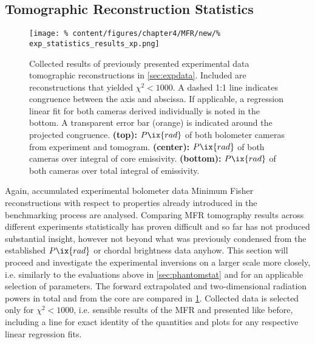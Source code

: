         \subsection{Tomographic Reconstruction Statistics}\label{sec:expstat}%
%
                \begin{figure}[t]%
                    \centering%
                    \captionsetup{width=.47\textwidth}%
                    \begin{minipage}[c]{0.47\textwidth}%
                        \centering%
                        \texttt{[image: \%
                            content/figures/chapter4/MFR/new/\%
                            exp\_statistics\_results\_xp.png]}%
                    \end{minipage}%
                    \hfill%
                    \begin{minipage}[c]{0.47\textwidth}%
                        \centering%
                        \caption{%
                            Collected results of previously presented experimental data tomographic reconstructions in \cref{sec:expdata}. Included are reconstructions that yielded $\chi^{2}<1000$. A dashed 1:1 line indicates congruence between the axis and abscissa. If applicable, a regression linear fit for both cameras derived individually is noted in the bottom. A transparent error bar (orange) is indicated around the projected congruence. \textbf{(top):} $P\ix{rad}$ of both bolometer cameras from experiment and tomogram. \textbf{(center):} $P\ix{rad}$ of both cameras over integral of core emissivity. \textbf{(bottom):} $P\ix{rad}$ of both cameras over total integral of emissivity.
                            }\label{fig:tomo_experiment_statistics}%
                    \end{minipage}%
                \end{figure}%
%
                Again, accumulated experimental bolometer data Minimum Fisher reconstructions with respect to properties already introduced in the benchmarking process are analysed. Comparing MFR tomography results across different experiments statistically has proven difficult and so far has not produced substantial insight, however not beyond what was previously condensed from the established $P\ix{rad}$ or chordal brightness data anyhow. This section will proceed and investigate the experimental inversions on a larger scale more closely, i.e. similarly to the evaluations above in \cref{sec:phantomstat} and for an applicable selection of parameters. The forward extrapolated and two-dimensional radiation powers in total and from the core are compared in \cref{fig:tomo_experiment_statistics}. Collected data is selected only for $\chi^{2}<1000$, i.e. sensible results of the MFR and presented like before, including a line for exact identity of the quantities and plots for any respective linear regression fits.\\%
